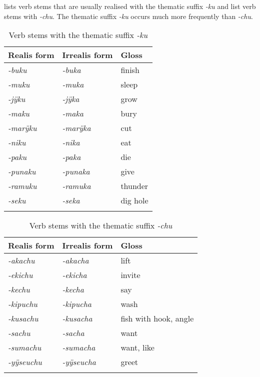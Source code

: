  lists verb stems that are usually realised with the thematic suffix \textit{-ku} and  list verb stems with \textit{-chu}. The thematic suffix \textit{-ku} occurs much more frequently than \textit{-chu}.

\begin{table}
\caption{Verb stems with the thematic suffix \textit{-ku}}

\begin{tabular}{lll}
\lsptoprule
Realis form & Irrealis form & Gloss \\
\midrule
\textit{-buku} & \textit{-buka} & finish\\
\textit{-muku} & \textit{-muka} & sleep\\
\textit{-jÿku} & \textit{-jÿka} & grow\\
\textit{-maku} & \textit{-maka} & bury\\
\textit{-marÿku} & \textit{-marÿka} & cut\\
\textit{-niku} & \textit{-nika} & eat\\
\textit{-paku} & \textit{-paka} & die\\
\textit{-punaku} & \textit{-punaka} & give\\
\textit{-ramuku} & \textit{-ramuka} & thunder\\
\textit{-seku} & \textit{-seka} & dig hole\\
\lspbottomrule
\end{tabular}

\label{table:Thematic1}
\end{table}


\begin{table}
\caption{Verb stems with the thematic suffix \textit{-chu}}

\begin{tabular}{lll}
\lsptoprule
Realis form & Irrealis form & Gloss \\
\midrule
\textit{-akachu} & \textit{-akacha} & lift\\
\textit{-ekichu} & \textit{-ekicha} & invite\\
\textit{-kechu} & \textit{-kecha} & say\\
\textit{-kipuchu} & \textit{-kipucha} & wash\\
\textit{-kusachu} & \textit{-kusacha} & fish with hook, angle\\
\textit{-sachu} & \textit{-sacha} & want\\
\textit{-sumachu} & \textit{-sumacha} & want, like\\
\textit{-yÿseuchu} & \textit{-yÿseucha} & greet\\
\lspbottomrule
\end{tabular}

\label{table:Thematic2}
\end{table}

